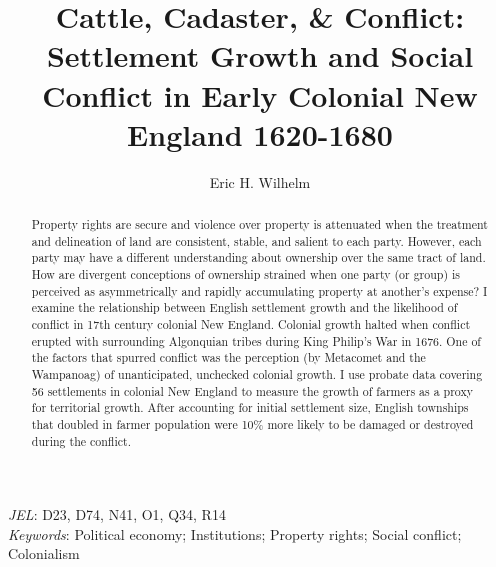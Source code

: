 \documentclass[11pt, oneside]{article}
\title{Cattle, Cadaster, \& Conflict: \\ Settlement Growth and Social Conflict in Early Colonial New England 1620-1680}
\author{Eric H. Wilhelm %
}
\date{}
\begin{document}
\maketitle

\begin{abstract}
\singlespacing
        Property rights are secure and violence over property is attenuated when the treatment and delineation of land are consistent, stable, and salient to each party. However, each party may have a different understanding about ownership over the same tract of land. How are divergent conceptions of ownership strained when one party (or group) is perceived as asymmetrically and rapidly accumulating property at another's expense? I examine the relationship between English settlement growth and the likelihood of conflict in 17th century colonial New England. Colonial growth halted when conflict erupted with surrounding Algonquian tribes during King Philip's War in 1676. One of the factors that spurred conflict was the perception (by Metacomet and the Wampanoag) of unanticipated, unchecked colonial growth. I use probate data covering 56 settlements in colonial New England to measure the growth of farmers as a proxy for territorial growth. After accounting for initial settlement size, English townships that doubled in farmer population were 10\% more likely to be damaged or destroyed during the conflict.     
  \end{abstract}
\textit{JEL}: D23, D74, N41, O1, Q34, R14 \\
\textit{Keywords}: Political economy; Institutions; Property rights; Social conflict; Colonialism

\pagebreak

\end{document}

